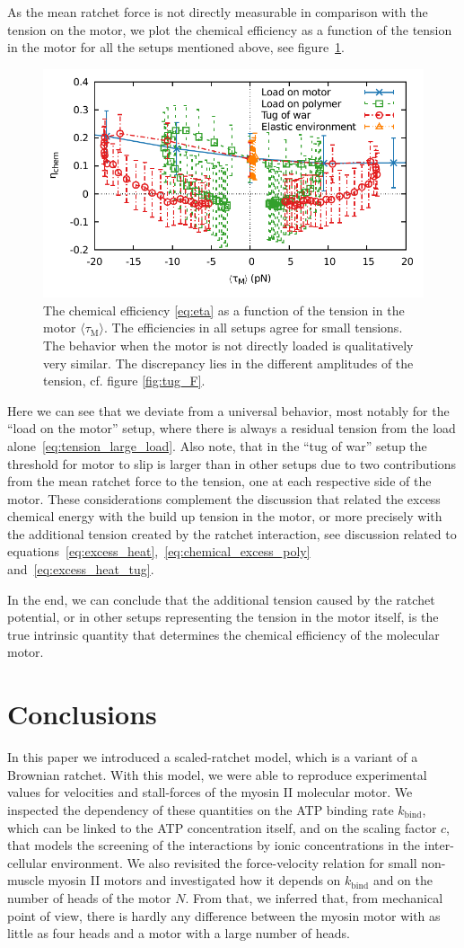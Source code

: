 \documentclass[aps,pre,twocolumn,showpacs,showkeys,superscriptaddress,floatfix]{revtex4-1}
\begin{document}
As the mean ratchet force is not directly measurable in comparison with the tension on the motor,
we plot the chemical efficiency as a function of the tension in the motor for all the setups mentioned above, 
see figure~\ref{fig:tension_efficiency}. 
\begin{figure}[t]
\centering
\includegraphics[width=.45\textwidth,height=!]{tension_eta.pdf}
\caption{\label{fig:tension_efficiency}
The chemical efficiency \eqref{eq:eta} as a function of the tension in the motor $\langle \tau_\text{M} \rangle$.
The efficiencies in all setups agree for small tensions.
The behavior when the motor is not directly loaded is qualitatively very similar.
The discrepancy lies in the different amplitudes of the tension, cf. figure \ref{fig:tug_F}. 
}
\end{figure}
Here we can see that we deviate from a universal behavior, 
most notably for the ``load on the motor'' setup, where there is always a residual tension from the load alone~\eqref{eq:tension_large_load}.
Also note, that in the ``tug of war'' setup the threshold for motor to slip is larger than in other setups due to two contributions from the mean ratchet force to the tension, one at each respective side of the motor.
These considerations complement the discussion that related the excess chemical energy with the build up tension in the motor, 
or more precisely with the additional tension created by the ratchet interaction, see discussion related to equations~\eqref{eq:excess_heat},~\eqref{eq:chemical_excess_poly} and~\eqref{eq:excess_heat_tug}. 

In the end, we can conclude that the additional tension caused by the ratchet potential, or in other setups representing the tension in the motor itself, is the true intrinsic quantity that determines the chemical efficiency of the molecular motor.


\section{Conclusions}
In this paper we introduced a scaled-ratchet model, which is a variant of a Brownian ratchet.
With this model, we were able to reproduce experimental values for  velocities and stall-forces of the myosin II molecular motor. 
We inspected the dependency of these quantities on the ATP binding rate $k_\text{bind}$, which can be linked to the ATP concentration itself, 
and on the scaling factor $c$, that models the screening of the interactions by ionic concentrations in the inter-cellular environment.
We also revisited the force-velocity relation for small non-muscle myosin II motors 
and investigated how it depends on $k_\text{bind}$ and on the number of heads of the motor $N$.
From that, we inferred that, from mechanical point of view, there is hardly any difference between the myosin motor with as little as four heads and a motor with a large number of heads. 
\end{document}

